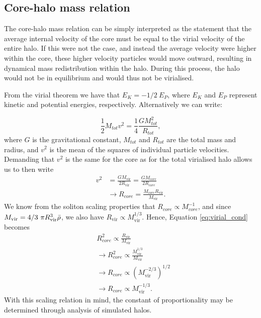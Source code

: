\documentclass[a4paper,11pt]{article}
\begin{document}
\begin{appendices}
\section{Core-halo mass relation}\label{app:core-halo}

The core-halo mass relation can be simply interpreted as the statement that the average internal velocity of the core must be equal to the virial velocity of the entire halo. If this were not the case, and instead the average velocity were higher within the core, these higher velocity particles would move outward, resulting in dynamical mass redistribution within the halo. During this process, the halo would not be in equilibrium and would thus not be virialised.

From the virial theorem we have that $E_K=-1/2 \ E_P$, where $E_K$ and $E_P$ represent kinetic and potential energies, respectively. Alternatively we can write:

\begin{equation}
    \frac{1}{2}M_{tot}v^2=\frac{1}{4}\frac{GM_{tot}^2}{R_{tot}},
\end{equation}
where $G$ is the gravitational constant, $M_{tot}$ and $R_{tot}$ are the total mass and radius, and $v^2$ is the mean of the squares of individual particle velocities. Demanding that $v^2$ is the same for the core as for the total virialised halo allows us to then write
\begin{align}\label{eq:virial_cond}
    v^2&=\frac{GM_{\mathrm{vir}}}{2 R_{\mathrm{vir}}}=\frac{G M_{core}}{2 R_{core}}\nonumber\\
    &\rightarrow R_{core}=\frac{M_{core} R_{\mathrm{vir}}}{M_{\mathrm{vir}}}.
\end{align}
We know from the soliton scaling properties that $R_{core}\propto M_{core}^{-1}$, and since $M_{\mathrm{vir}}=4/3 \ \pi R_{\mathrm{vir}}^3 \Bar{\rho}$, we also have $R_{\mathrm{vir}} \propto M_{\mathrm{vir}}^{1/3}$. Hence, Equation \ref{eq:virial_cond} becomes
\begin{align}
    &R_{core}^2\propto \frac{R_{\mathrm{vir}}}{M_{\mathrm{vir}}}\nonumber\\
    &\rightarrow R_{core}^2\propto \frac{M_{\mathrm{vir}}^{1/3}}{M_{\mathrm{vir}}}\nonumber\\
    &\rightarrow R_{core}\propto\left(M_{\mathrm{vir}}^{-2/3}\right)^{1/2}\nonumber\\
    &\rightarrow R_{core}\propto M_{\mathrm{vir}}^{-1/3}.
\end{align}
With this scaling relation in mind, the constant of proportionality may be determined through analysis of simulated halos. 





\end{appendices}
\end{document}

